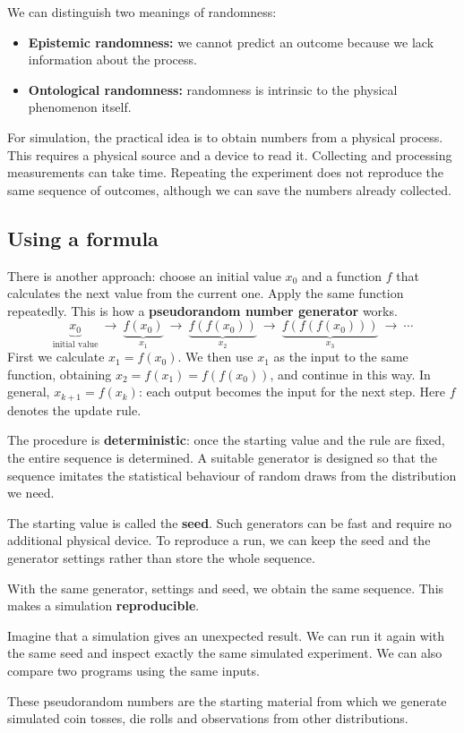 \documentclass[a4paper,12pt,oneside]{report}
\begin{document}
We can distinguish two meanings of randomness:
\begin{itemize}
  \item \textbf{Epistemic randomness:} we cannot predict an outcome
    because we lack information about the process.
  \item \textbf{Ontological randomness:} randomness is intrinsic to
    the physical phenomenon itself.
\end{itemize}
For simulation, the practical idea is to obtain numbers from a
physical process. This requires a physical source and a device to
read it. Collecting and processing measurements can take time.
Repeating the experiment does not reproduce the same sequence of
outcomes, although we can save the numbers already collected.

\subsection{Using a formula}
There is another approach: choose an initial value $x_0$ and a
function $f$ that calculates the next value from the current one.
Apply the same function repeatedly. This is how a
\textbf{pseudorandom number generator} works.
\[
  \underbrace{x_0}_{\text{initial value}}
  \ \longrightarrow\ \underbrace{f(x_0)}_{x_1}
  \ \longrightarrow\ \underbrace{f(f(x_0))}_{x_2}
  \ \longrightarrow\ \underbrace{f(f(f(x_0)))}_{x_3}
  \ \longrightarrow\ \cdots
\]
First we calculate $x_1=f(x_0)$. We then use $x_1$ as the input
to the same function, obtaining $x_2=f(x_1)=f(f(x_0))$, and
continue in this way. In general, $x_{k+1}=f(x_k)$: each output
becomes the input for the next step. Here $f$ denotes the update rule.

The procedure is \textbf{deterministic}: once the starting value and
the rule are fixed, the entire sequence is determined. A suitable
generator is designed so that the sequence imitates the statistical
behaviour of random draws from the distribution we need.

The starting value is called the \textbf{seed}. Such generators can be fast
and require no additional physical device. To reproduce a run,
we can keep the seed and the generator settings rather than store
the whole sequence.

\begin{notebox}
With the same generator, settings and seed, we obtain the same
sequence. This makes a simulation \textbf{reproducible}.

Imagine that a simulation gives an unexpected result. We can run it
again with the same seed and inspect exactly the same simulated
experiment. We can also compare two programs using the same inputs.

These pseudorandom numbers are the starting material from which
we generate simulated coin tosses, die rolls and observations from
other distributions.
\end{notebox}
\end{document}
